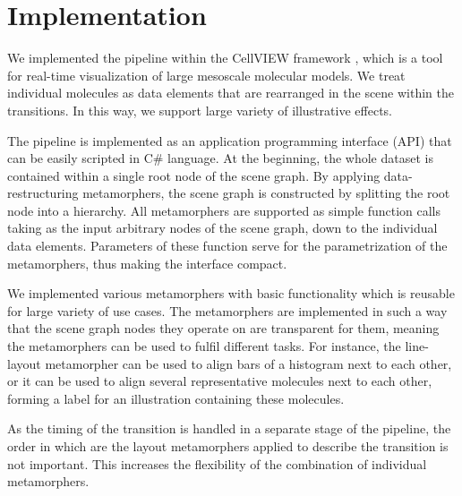 \vspace{-7pt}
\section{Implementation}
\vspace{-2pt}
We implemented the pipeline within the CellVIEW framework \cite{muzic15}, which is a tool for real-time visualization of large mesoscale molecular models. We treat individual molecules as data elements that are rearranged in the scene within the transitions. In this way, we support large variety of illustrative effects.

The pipeline is implemented as an application programming interface (API) that can be easily scripted in C\# language. At the beginning, the whole dataset is contained within a single root node of the scene graph. By applying data-restructuring metamorphers, the scene graph is constructed by splitting the root node into a hierarchy. All metamorphers are supported as simple function calls taking as the input arbitrary nodes of the scene graph, down to the individual data elements. Parameters of these function serve for the parametrization of the metamorphers, thus making the interface compact.

We implemented various metamorphers with basic functionality which is reusable for large variety of use cases. The metamorphers are implemented in such a way that the scene graph nodes they operate on are transparent for them, meaning the metamorphers can be used to fulfil different tasks. For instance, the line-layout metamorpher can be used to align bars of a histogram next to each other, or it can be used to align several representative molecules next to each other, forming a label for an illustration containing these molecules.

As the timing of the transition is handled in a separate stage of the pipeline, the order in which are the layout metamorphers applied to describe the transition is not important. This increases the flexibility of the combination of individual metamorphers.



